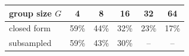 \setlength{\tabcolsep}{4pt}
\begin{tabular}{lccccc}
\toprule
group size $G$ & 4 & 8 & 16 & 32 & 64 \\
\midrule
closed form & 59\% & 44\% & 32\% & 23\% & 17\% \\
subsampled & 59\% & 43\% & 30\% & -- & -- \\
\bottomrule
\end{tabular}
